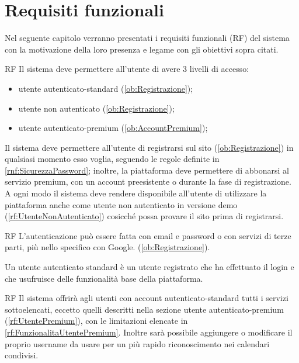 \section{Requisiti funzionali}
\label{sec:RequisitiFunzionali}
Nel seguente capitolo verranno presentati i requisiti funzionali (RF) del sistema con la motivazione della loro presenza e legame con gli obiettivi sopra citati.
\begin{listaPersonale}{RF}
	 Il sistema deve permettere all'utente di avere 3 livelli di accesso:
	\begin{itemize}
		\item utente autenticato-standard (\ref{ob:Registrazione});
		\item utente non autenticato (\ref{ob:Registrazione});
		\item utente autenticato-premium (\ref{ob:AccountPremium});
	\end{itemize}Il sistema deve permettere all'utente di registrarsi sul sito (\ref{ob:Registrazione}) in qualsiasi momento esso voglia, seguendo le regole definite in \ref{rnf:SicurezzaPassword}; inoltre, la piattaforma deve permettere di abbonarsi al servizio premium, con un account preesistente o durante la fase di registrazione.\\
	A ogni modo il sistema deve rendere disponibile all'utente di utilizzare la piattaforma anche come utente non autenticato in versione demo (\ref{rf:UtenteNonAutenticato}) cosicché possa provare il sito prima di registrarsi.
	\begin{listaPersonale2}{RF}
		 L'autenticazione può essere fatta con email e password o con servizi di terze parti, più nello specifico con Google. (\ref{ob:Registrazione}).
	\end{listaPersonale2}

	 Un utente autenticato standard è un utente registrato che ha effettuato il login e che usufruisce delle funzionalità base della piattaforma.
	\begin{listaPersonale2}{RF}
		 Il sistema offrirà agli utenti con account autenticato-standard tutti i servizi sottoelencati, eccetto quelli descritti nella sezione utente autenticato-premium (\ref{rf:UtentePremium}), con le limitazioni elencate in \ref{rf:FunzionalitaUtentePremium}. Inoltre sarà possibile aggiungere o modificare il proprio username da usare per un più rapido riconoscimento nei calendari condivisi.


\end{listaPersonale2}
\end{listaPersonale}
